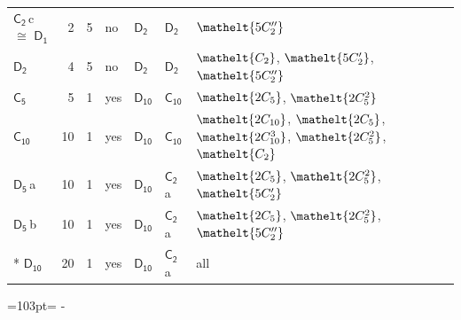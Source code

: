 \documentclass[10pt,a4paper]{article}
\newcommand{\needspace}[1]{\par\penalty-100\begingroup\dimen0=#1\relax\dimen2=\pagegoal
  \advance\dimen2-\pagetotal\ifdim\dimen0>\dimen2\relax\ifdim\dimen2>0pt\vfil\break\fi\fi
  \endgroup}
\numberwithin{equation}{section}
\newcommand{\eltfont}[1]{{\let\sigma\eltsigma\mathelt{#1}}}
\newcommand{\grp}[1]{\mathsf{#1}}
\newcommand{\cls}[1]{\eltfont{#1}}
\newcommand{\samecls}{\cong}
\newcommand{\clsletter}[1]{\,{\scriptsize\color{black!55}#1}}
\newlength{\fillwidth}\newlength{\cellwidth}\newlength{\colwidth}
\begin{document}
{\begin{longtable}{@{}lrrlll>{\RaggedRight\arraybackslash}p{\fillwidth}@{}}
\href{C2.pdf}{$\grp{C_{2}}$}\clsletter{c} $\samecls$ \href{D1.pdf}{$\grp{D_{1}}$} & 2 & 5 & no & \href{D2.pdf}{$\grp{D_{2}}$} & \href{D2.pdf}{$\grp{D_{2}}$} & $\cls{5C_{2}''}$\\
\href{D2.pdf}{$\grp{D_{2}}$} & 4 & 5 & no & \href{D2.pdf}{$\grp{D_{2}}$} & \href{D2.pdf}{$\grp{D_{2}}$} & $\cls{C_{2}}$, $\cls{5C_{2}'}$, $\cls{5C_{2}''}$\\
\href{C5.pdf}{$\grp{C_{5}}$} & 5 & 1 & yes & \href{D10.pdf}{$\grp{D_{10}}$} & \href{C10.pdf}{$\grp{C_{10}}$} & $\cls{2C_{5}}$, $\cls{2C_{5}^{2}}$\\
\href{C10.pdf}{$\grp{C_{10}}$} & 10 & 1 & yes & \href{D10.pdf}{$\grp{D_{10}}$} & \href{C10.pdf}{$\grp{C_{10}}$} & $\cls{2C_{10}}$, $\cls{2C_{5}}$, $\cls{2C_{10}^{3}}$, $\cls{2C_{5}^{2}}$, $\cls{C_{2}}$\\
\href{D5.pdf}{$\grp{D_{5}}$}\clsletter{a} & 10 & 1 & yes & \href{D10.pdf}{$\grp{D_{10}}$} & \href{C2.pdf}{$\grp{C_{2}}$}\clsletter{a} & $\cls{2C_{5}}$, $\cls{2C_{5}^{2}}$, $\cls{5C_{2}'}$\\
\href{D5.pdf}{$\grp{D_{5}}$}\clsletter{b} & 10 & 1 & yes & \href{D10.pdf}{$\grp{D_{10}}$} & \href{C2.pdf}{$\grp{C_{2}}$}\clsletter{a} & $\cls{2C_{5}}$, $\cls{2C_{5}^{2}}$, $\cls{5C_{2}''}$\\*
\href{D10.pdf}{$\grp{D_{10}}$} & 20 & 1 & yes & \href{D10.pdf}{$\grp{D_{10}}$} & \href{C2.pdf}{$\grp{C_{2}}$}\clsletter{a} & all\\
\bottomrule\end{longtable}}
\needspace{103pt}
\end{document}
